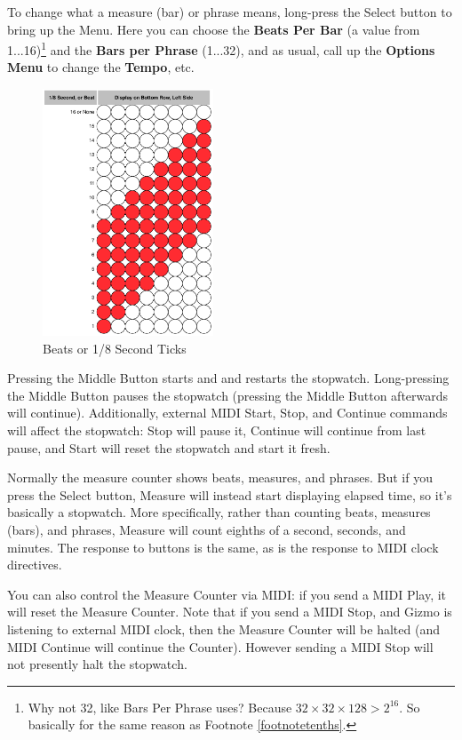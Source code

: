 \documentclass{article}
\begin{document}
	To change what a measure (bar) or phrase means, long-press the Select button to bring up the Menu.  Here you can choose the {\bf Beats Per Bar} (a value from 1...16)\footnote{Why not 32, like Bars Per Phrase uses?  Because \(32 \times 32 \times 128 > 2^{16}\).  So basically for the same reason as Footnote \ref{footnotetenths}.} and the {\bf Bars per Phrase} (1...32), and as usual, call up the {\bf Options Menu} to change the {\bf Tempo}, etc.
	
\begin{figure}
\includegraphics[width=2in]{measurebeats}
\vspace{-2em}\caption{\small Beats or 1/8 Second Ticks}\vspace{-3em}
\label{midichannelvalues}
\end{figure}


	Pressing the Middle Button starts and and restarts the stopwatch.  Long-pressing the Middle Button pauses the stopwatch (pressing the Middle Button afterwards will continue).  Additionally, external MIDI Start, Stop, and Continue commands will affect the stopwatch: Stop will pause it, Continue will continue from last pause, and Start will reset the stopwatch and start it fresh.

	Normally the measure counter shows beats, measures, and phrases.  But if you press the Select button, Measure will instead start displaying elapsed time, so it's basically a stopwatch.  More specifically, rather than counting beats, measures (bars), and phrases, Measure will count eighths of a second, seconds, and minutes.  The response to buttons is the same, as is the response to MIDI clock directives.

	You can also control the Measure Counter via MIDI: if you send a MIDI Play, it will reset the Measure Counter.  Note that if you send a MIDI Stop, and Gizmo is listening to external MIDI clock, then the Measure Counter will be halted (and MIDI Continue will continue the Counter).  However sending a MIDI Stop will not presently halt the stopwatch.
\end{document}
